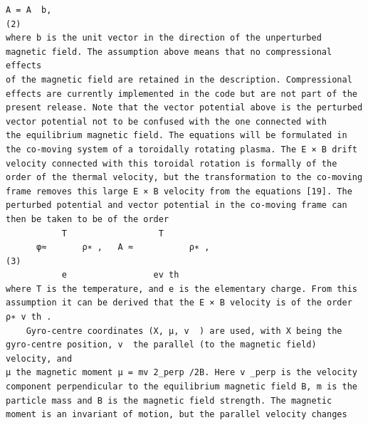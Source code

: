 \documentclass[a4paper]{article}
\newcommand{\gkwpagefont}{\fontsize{6.0pt}{7.55pt}\selectfont}
\begin{document}
\begin{Verbatim}[fontsize=\gkwpagefont]
      A = A  b,                                                                                                                                         (2)
where b is the unit vector in the direction of the unperturbed magnetic field. The assumption above means that no compressional effects
of the magnetic field are retained in the description. Compressional effects are currently implemented in the code but are not part of the
present release. Note that the vector potential above is the perturbed vector potential not to be confused with the one connected with
the equilibrium magnetic field. The equations will be formulated in the co-moving system of a toroidally rotating plasma. The E × B drift
velocity connected with this toroidal rotation is formally of the order of the thermal velocity, but the transformation to the co-moving
frame removes this large E × B velocity from the equations [19]. The perturbed potential and vector potential in the co-moving frame can
then be taken to be of the order
           T                  T
      φ≈       ρ∗ ,   A ≈           ρ∗ ,                                                                                                                (3)
           e                 ev th
where T is the temperature, and e is the elementary charge. From this assumption it can be derived that the E × B velocity is of the order
ρ∗ v th .
    Gyro-centre coordinates (X, μ, v  ) are used, with X being the gyro-centre position, v  the parallel (to the magnetic field) velocity, and
μ the magnetic moment μ = mv 2_perp /2B. Here v _perp is the velocity component perpendicular to the equilibrium magnetic field B, m is the
particle mass and B is the magnetic field strength. The magnetic moment is an invariant of motion, but the parallel velocity changes
\end{Verbatim}
\newpage
\end{document}
